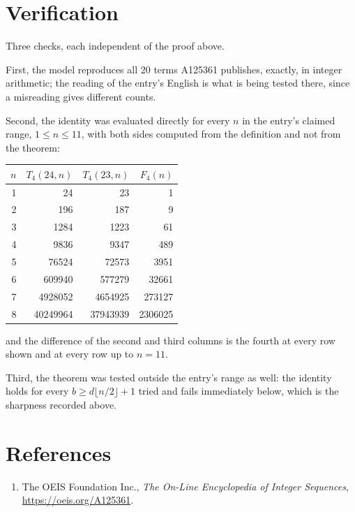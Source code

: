 \documentclass[11pt,a4paper]{article}
\theoremstyle{plain}
\theoremstyle{definition}
\begin{document}
\section{Verification}

Three checks, each independent of the proof above.

First, the model reproduces all $20$ terms A125361 publishes, exactly, in integer
arithmetic; the reading of the entry's English is what is being tested there, since a
misreading gives different counts.

Second, the identity was evaluated directly for every $n$ in the entry's claimed range,
$1\le n\le11$, with both sides computed from the definition and not from the theorem:

\begin{center}
\begin{tabular}{rrrr}
$n$ & $T_{4}(24,n)$ & $T_{4}(23,n)$ & $F_{4}(n)$ \\ \hline
1 & 24 & 23 & 1 \\
2 & 196 & 187 & 9 \\
3 & 1284 & 1223 & 61 \\
4 & 9836 & 9347 & 489 \\
5 & 76524 & 72573 & 3951 \\
6 & 609940 & 577279 & 32661 \\
7 & 4928052 & 4654925 & 273127 \\
8 & 40249964 & 37943939 & 2306025 \\
\end{tabular}
\end{center}

\noindent and the difference of the second and third columns is the fourth at every row shown
and at every row up to $n=11$.

Third, the theorem was tested outside the entry's range as well: the identity holds for every
$b\ge d\lfloor n/2\rfloor+1$ tried and fails immediately below, which is the sharpness recorded
above.

\section*{References}
\begin{enumerate}
\item The OEIS Foundation Inc., \emph{The On-Line Encyclopedia of Integer Sequences},
\url{https://oeis.org/A125361}.
\end{enumerate}
\end{document}
